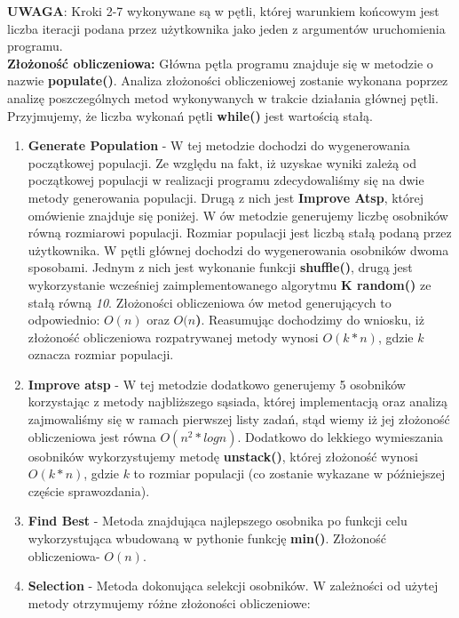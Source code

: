   \textbf{UWAGA}: Kroki 2-7 wykonywane są w pętli, której warunkiem końcowym jest liczba iteracji podana przez użytkownika jako jeden z argumentów uruchomienia programu. \\
 \textbf{Złożoność obliczeniowa: }
    Główna pętla programu znajduje się w metodzie o nazwie \textbf{populate()}. Analiza złożoności obliczeniowej zostanie wykonana poprzez analizę poszczególnych metod
    wykonywanych w trakcie działania głównej pętli. Przyjmujemy, że liczba wykonań pętli \textbf{while()} jest wartością stałą.
    \begin{enumerate}
      \item \textbf{Generate Population} - W tej metodzie dochodzi do wygenerowania początkowej populacji. Ze względu na fakt, iż uzyskae wyniki zależą od początkowej populacji 
      w realizacji programu zdecydowaliśmy się na dwie metody generowania populacji. Drugą z nich jest \textbf{Improve Atsp}, której omówienie znajduje się poniżej.
      W ów metodzie generujemy liczbę osobników równą rozmiarowi populacji. Rozmiar populacji jest liczbą stałą podaną przez użytkownika.
      W pętli głównej dochodzi do wygenerowania osobników dwoma sposobami. Jednym z nich jest wykonanie funkcji \textbf{shuffle()}, drugą jest wykorzystanie
      wcześniej zaimplementowanego algorytmu \textbf{K random()} ze stałą równą \textit{10}. 
      Złożoności obliczeniowa ów metod generujących to odpowiednio: \textbf{$O(n)$} oraz \textbf{$O(n$)}. Reasumując dochodzimy do wniosku, iż złożoność obliczeniowa
      rozpatrywanej metody wynosi \textbf{$O(k*n)$}, gdzie $k$ oznacza rozmiar populacji.
      \item \textbf{Improve atsp} - W tej metodzie dodatkowo generujemy 5 osobników korzystając z metody najbliższego sąsiada, której implementacją oraz analizą zajmowaliśmy się w ramach pierwszej listy zadań, stąd wiemy 
      iż jej złożoność obliczeniowa jest równa $O(n^2*log n)$. Dodatkowo do lekkiego wymieszania osobników wykorzystujemy metodę \textbf{unstack()}, której złożoność wynosi \textbf{$O(k*n)$}, gdzie $k$ to rozmiar populacji (co zostanie wykazane w późniejszej częście sprawozdania).
      \item \textbf{Find Best} - Metoda znajdująca najlepszego osobnika po funkcji celu wykorzystująca wbudowaną w pythonie funkcję \textbf{min()}. Złożoność obliczeniowa- \textbf{$O(n)$}.
      \item \textbf{Selection} - Metoda dokonująca selekcji osobników. W zależności od użytej metody otrzymujemy różne złożoności obliczeniowe:
      \begin{itemize}

\end{itemize}
\end{enumerate}
